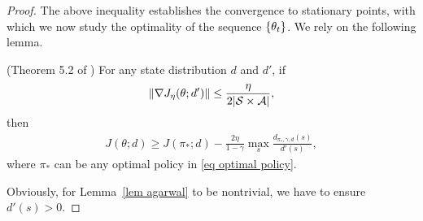 \documentclass[twoside,11pt]{article}
\newcommand{\fS}{\mathcal{S}}
\newcommand{\fA}{\mathcal{A}}
\newcommand{\nsa}{{|\fS \times \fA|}}
\numberwithin{assucounter}{section}
\begin{document}
\begin{proof}
The above inequality establishes the convergence to stationary points,
with which we now study the optimality of the sequence $\qty{\theta_t}$.
We rely on the following lemma.
\begin{lemma}
  \label{lem agarwal}
  (Theorem 5.2 of \citet{agarwal2019optimality})
  For any state distribution $d$ and $d'$,
  if 
  \begin{align}
    \norm{\nabla J_\eta(\theta; d')} \leq \frac{\eta}{2\nsa},
  \end{align}
  then
  \begin{align}
    J(\theta; d) \geq J(\pi_*; d) - \frac{2\eta}{1 - \gamma} \max_s {\frac{d_{\pi_*, \gamma, d}(s)}{d'(s)}},
  \end{align}
  where $\pi_*$ can be any optimal policy in \eqref{eq optimal policy}. 
\end{lemma}
Obviously,
for Lemma~\ref{lem agarwal} to be nontrivial,
we have to ensure $d'(s) > 0$.


\end{proof}
\end{document}
